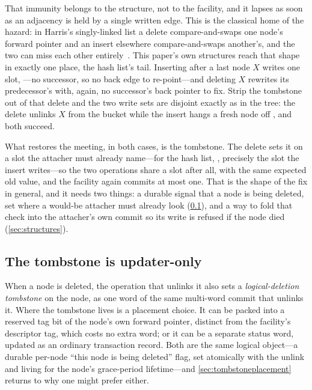 \documentclass[11pt]{article}
\begin{document}
That immunity belongs to the structure, not to the facility, and it lapses as soon
as an adjacency is held by a single written edge. This is the classical home of
the hazard: in Harris's singly-linked list a delete compare-and-swaps one node's
forward pointer and an insert elsewhere compare-and-swaps another's, and the two
can miss each other entirely~\citep{harris2001lists}. This paper's own structures
reach that shape in exactly one place, the hash list's tail. Inserting after a
last node $X$ writes one slot, ---no successor, so no back edge to
re-point---and deleting $X$ rewrites its predecessor's  with, again, no
successor's back pointer to fix. Strip the tombstone out of that delete and the
two write sets are disjoint exactly as in the tree: the delete unlinks $X$ from
the bucket while the insert hangs a fresh node off , and both
succeed.

What restores the meeting, in both cases, is the tombstone. The delete sets it on
a slot the attacher must already name---for the hash list, ,
precisely the slot the insert writes---so the two operations share a slot after
all, with the same expected old value, and the facility again commits at most one.
That is the shape of the fix in general, and it needs two things: a durable signal
that a node is being deleted, set where a would-be attacher must already look
(\cref{sec:mark}), and a way to fold that check into the attacher's own commit so
its write is refused if the node died (\cref{sec:structures}).

\subsection{The tombstone is updater-only}
\label{sec:mark}

When a node is deleted, the operation that unlinks it also sets a
\emph{logical-deletion tombstone} on the node, as one word of the same multi-word
commit that unlinks it. Where the tombstone lives is a placement choice. It can
be packed into a reserved tag bit of the node's own forward pointer, distinct
from the facility's descriptor tag, which costs no extra word; or it can be a
separate status word, updated as an ordinary transaction record. Both are the
same logical object---a durable per-node ``this node is being deleted'' flag, set
atomically with the unlink and living for the node's grace-period lifetime---and
\cref{sec:tombstoneplacement} returns to why one might prefer either.
\end{document}
